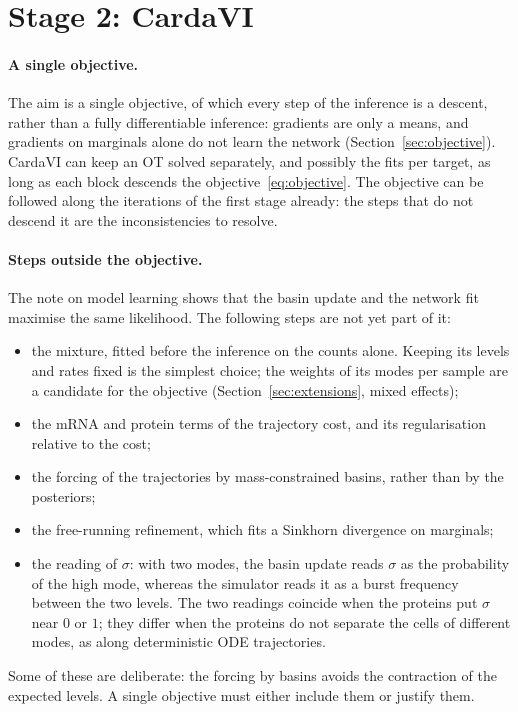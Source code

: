\documentclass[a4paper, 11pt]{article}
\theoremstyle{plain}
\theoremstyle{remark}
\begin{document}
\section{Stage 2: CardaVI}\label{sec:stage2}

\paragraph{A single objective.} The aim is a single objective, of which every step of the inference is a descent, rather than a fully differentiable inference: gradients are only a means, and gradients on marginals alone do not learn the network (Section~\ref{sec:objective}). CardaVI can keep an OT solved separately, and possibly the fits per target, as long as each block descends the objective~\eqref{eq:objective}. The objective can be followed along the iterations of the first stage already: the steps that do not descend it are the inconsistencies to resolve.

\paragraph{Steps outside the objective.} The note on model learning shows that the basin update and the network fit maximise the same likelihood. The following steps are not yet part of it:
\begin{itemize}[nosep]
\item the mixture, fitted before the inference on the counts alone. Keeping its levels and rates fixed is the simplest choice; the weights of its modes per sample are a candidate for the objective (Section~\ref{sec:extensions}, mixed effects);
\item the mRNA and protein terms of the trajectory cost, and its regularisation relative to the cost;
\item the forcing of the trajectories by mass-constrained basins, rather than by the posteriors;
\item the free-running refinement, which fits a Sinkhorn divergence on marginals;
\item the reading of $\sigma$: with two modes, the basin update reads $\sigma$ as the probability of the high mode, whereas the simulator reads it as a burst frequency between the two levels. The two readings coincide when the proteins put $\sigma$ near $0$ or $1$; they differ when the proteins do not separate the cells of different modes, as along deterministic ODE trajectories.
\end{itemize}
Some of these are deliberate: the forcing by basins avoids the contraction of the expected levels. A single objective must either include them or justify them.
\end{document}
